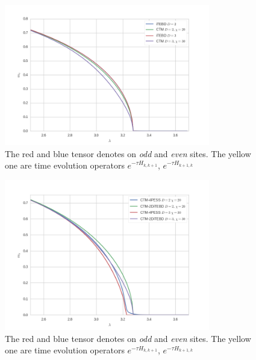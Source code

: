 \begin{figure}[H]
	\centering
	\includegraphics[width=0.80\textwidth]{figures/ctm_itebd.png}
	\caption[The picture of the main idea of itebd.]{The red and blue tensor denotes on \textit{odd} and \textit{even} sites. The yellow one are time evolution operators $e^{-\tau H_{k,k+1}}$, $e^{-\tau H_{k+1,k}}$}
	\label{fig522}
\end{figure}

\begin{figure}[H]
	\centering
	\includegraphics[width=0.80\textwidth]{figures/ctm_pess.png}
	\caption[The picture of the main idea of itebd.]{The red and blue tensor denotes on \textit{odd} and \textit{even} sites. The yellow one are time evolution operators $e^{-\tau H_{k,k+1}}$, $e^{-\tau H_{k+1,k}}$}
	\label{fig523}
\end{figure}


